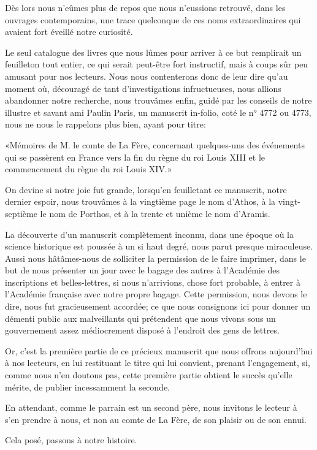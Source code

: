 Dès lors nous n'eûmes plus de repos que nous n'eussions retrouvé, dans les ouvrages contemporains, une trace quelconque de ces noms extraordinaires qui avaient fort éveillé notre curiosité. 

Le seul catalogue des livres que nous lûmes pour arriver à ce but remplirait un feuilleton tout entier, ce qui serait peut-être fort instructif, mais à coups sûr peu amusant pour nos lecteurs. Nous nous contenterons donc de leur dire qu'au moment où, découragé de tant d'investigations infructueuses, nous allions abandonner notre recherche, nous trouvâmes enfin, guidé par les conseils de notre illustre et savant ami Paulin Paris, un manuscrit in-folio, coté le n° 4772 ou 4773, nous ne nous le rappelons plus bien, ayant pour titre: 

«Mémoires de M. le comte de La Fère, concernant quelques-uns des événements qui se passèrent en France vers la fin du règne du roi Louis XIII et le commencement du règne du roi Louis XIV.» 

On devine si notre joie fut grande, lorsqu'en feuilletant ce manuscrit, notre dernier espoir, nous trouvâmes à la vingtième page le nom d'Athos, à la vingt-septième le nom de Porthos, et à la trente et unième le nom d'Aramis. 

La découverte d'un manuscrit complètement inconnu, dans une époque où la science historique est poussée à un si haut degré, nous parut presque miraculeuse. Aussi nous hâtâmes-nous de solliciter la permission de le faire imprimer, dans le but de nous présenter un jour avec le bagage des autres à l'Académie des inscriptions et belles-lettres, si nous n'arrivions, chose fort probable, à entrer à l'Académie française avec notre propre bagage. Cette permission, nous devons le dire, nous fut gracieusement accordée; ce que nous consignons ici pour donner un démenti public aux malveillants qui prétendent que nous vivons sous un gouvernement assez médiocrement disposé à l'endroit des gens de lettres. 

Or, c'est la première partie de ce précieux manuscrit que nous offrons aujourd'hui à nos lecteurs, en lui restituant le titre qui lui convient, prenant l'engagement, si, comme nous n'en doutons pas, cette première partie obtient le succès qu'elle mérite, de publier incessamment la seconde. 

En attendant, comme le parrain est un second père, nous invitons le lecteur à s'en prendre à nous, et non au comte de La Fère, de son plaisir ou de son ennui. 

Cela posé, passons à notre histoire.